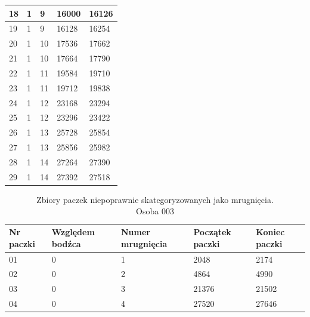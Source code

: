 \documentclass{article}
\begin{document}
\begin{table}[H]
\begin{center}
\begin{tabular}{| p{1cm} | p{1.75cm} | p{1.75cm} | p{1.75cm} | p{1.75cm} |}
                    \hline
                    18 & 1 & 9 & 16000 & 16126 \\
                    \hline
                    19 & 1 & 9 & 16128 & 16254 \\
                    \hline
                    20 & 1 & 10 & 17536 & 17662 \\
                    \hline
                    21 & 1 & 10 & 17664 & 17790 \\
                    \hline
                    22 & 1 & 11 & 19584 & 19710 \\
                    \hline
                    23 & 1 & 11 & 19712 & 19838 \\
                    \hline
                    24 & 1 & 12 & 23168 & 23294 \\
                    \hline
                    25 & 1 & 12 & 23296 & 23422 \\
                    \hline
                    26 & 1 & 13 & 25728 & 25854 \\
                    \hline
                    27 & 1 & 13 & 25856 & 25982 \\
                    \hline
                    28 & 1 & 14 & 27264 & 27390 \\
                    \hline
                    29 & 1 & 14 & 27392 & 27518 \\
                    \hline
                \end{tabular}
            \end{center}
        \end{table}

        \begin{table}[H]
            \captionsetup{justification=centering}
            \caption {Zbiory paczek niepoprawnie skategoryzowanych jako mrugnięcia. \\Osoba 003}
            \begin{center}
                \begin{tabular}{| p{1cm} | p{1.75cm} | p{1.75cm} | p{1.75cm} | p{1.75cm} |}
                    \hline
                    Nr paczki & Względem bodźca & Numer mrugnięcia & Początek paczki & Koniec paczki \\
                    \hline
                    \hline
                    01 & 0 & 1 & 2048 & 2174 \\
                    \hline
                    02 & 0 & 2 & 4864 & 4990 \\
                    \hline
                    03 & 0 & 3 & 21376 & 21502 \\
                    \hline
                    04 & 0 & 4 & 27520 & 27646 \\
                    \hline
                \end{tabular}
            \end{center}
        \end{table}
\end{document}
